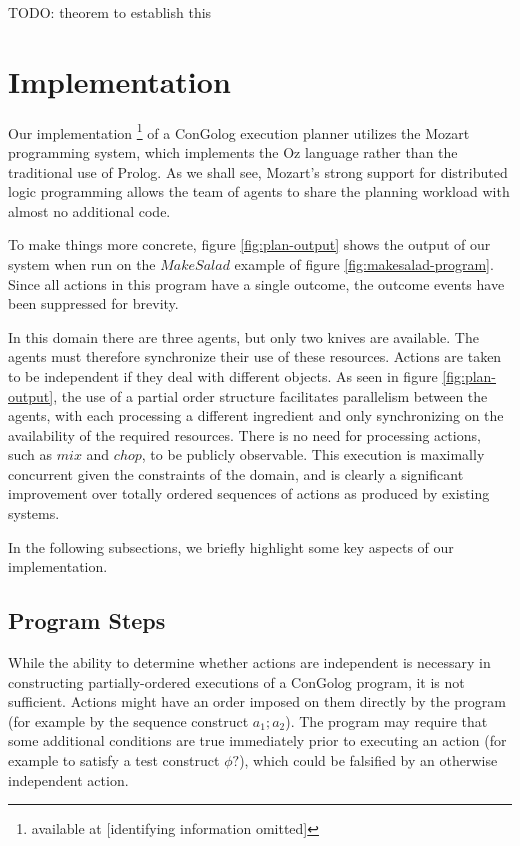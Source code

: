 TODO: theorem to establish this


\section{Implementation\label{sec:JointExec:Implementation}}

Our implementation%
\footnote{available at {[}identifying information omitted]%
} of a ConGolog execution planner utilizes the Mozart programming system,
which implements the Oz language \citep{vanroy99mozart} rather than
the traditional use of Prolog. As we shall see, Mozart's strong support
for distributed logic programming allows the team of agents to share
the planning workload with almost no additional code.

To make things more concrete, figure \ref{fig:plan-output} shows
the output of our system when run on the $MakeSalad$ example of figure
\ref{fig:makesalad-program}. Since all actions in this program have
a single outcome, the outcome events have been suppressed for brevity.

In this domain there are three agents, but only two knives are available.
The agents must therefore synchronize their use of these resources.
Actions are taken to be independent if they deal with different objects.
As seen in figure \ref{fig:plan-output}, the use of a partial order
structure facilitates parallelism between the agents, with each processing
a different ingredient and only synchronizing on the availability
of the required resources. There is no need for processing actions,
such as $mix$ and $chop$, to be publicly observable. This execution
is maximally concurrent given the constraints of the domain, and is
clearly a significant improvement over totally ordered sequences of
actions as produced by existing systems.

In the following subsections, we briefly highlight some key aspects
of our implementation.


\subsection{Program Steps}

While the ability to determine whether actions are independent is
necessary in constructing partially-ordered executions of a ConGolog
program, it is not sufficient. Actions might have an order imposed
on them directly by the program (for example by the sequence construct
$a_{1};a_{2}$). The program may require that some additional conditions
are true immediately prior to executing an action (for example to
satisfy a test construct $\phi?$), which could be falsified by an
otherwise independent action.

